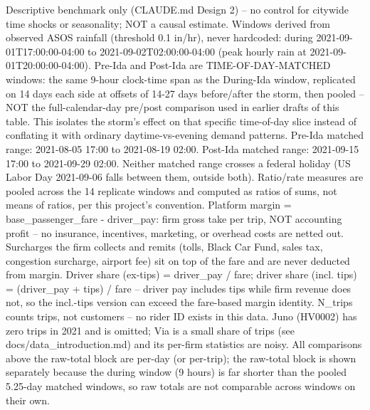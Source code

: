 \begin{table}[!h]
{\begin{threeparttable}
\begin{tablenotes}
\item Descriptive benchmark only (CLAUDE.md Design 2) -- no control for citywide time shocks or seasonality; NOT a causal estimate. Windows derived from observed ASOS rainfall (threshold 0.1 in/hr), never hardcoded: during 2021-09-01T17:00:00-04:00 to 2021-09-02T02:00:00-04:00 (peak hourly rain at 2021-09-01T20:00:00-04:00). Pre-Ida and Post-Ida are TIME-OF-DAY-MATCHED windows: the same 9-hour clock-time span as the During-Ida window, replicated on 14 days each side at offsets of 14-27 days before/after the storm, then pooled -- NOT the full-calendar-day pre/post comparison used in earlier drafts of this table. This isolates the storm's effect on that specific time-of-day slice instead of conflating it with ordinary daytime-vs-evening demand patterns. Pre-Ida matched range: 2021-08-05 17:00 to 2021-08-19 02:00. Post-Ida matched range: 2021-09-15 17:00 to 2021-09-29 02:00. Neither matched range crosses a federal holiday (US Labor Day 2021-09-06 falls between them, outside both). Ratio/rate measures are pooled across the 14 replicate windows and computed as ratios of sums, not means of ratios, per this project's convention. Platform margin = base_passenger_fare - driver_pay: firm gross take per trip, NOT accounting profit -- no insurance, incentives, marketing, or overhead costs are netted out. Surcharges the firm collects and remits (tolls, Black Car Fund, sales tax, congestion surcharge, airport fee) sit on top of the fare and are never deducted from margin. Driver share (ex-tips) = driver_pay / fare; driver share (incl. tips) = (driver_pay + tips) / fare -- driver pay includes tips while firm revenue does not, so the incl.-tips version can exceed the fare-based margin identity. N_trips counts trips, not customers -- no rider ID exists in this data. Juno (HV0002) has zero trips in 2021 and is omitted; Via is a small share of trips (see docs/data_introduction.md) and its per-firm statistics are noisy. All comparisons above the raw-total block are per-day (or per-trip); the raw-total block is shown separately because the during window (9 hours) is far shorter than the pooled 5.25-day matched windows, so raw totals are not comparable across windows on their own.
\end{tablenotes}
\end{threeparttable}}
\end{table}
